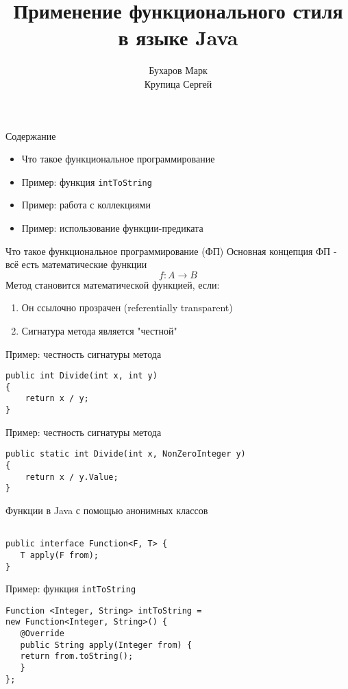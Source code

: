 \documentclass[aspectratio=169]{beamer}
\date{}
\title{Применение функционального стиля в языке Java}
\author{Бухаров Марк \\ Крупица Сергей}
\begin{document}
\begin{frame} 
	\titlepage
\end{frame}

\begin{frame}{Содержание}
	\begin{itemize}
		\item Что такое функциональное программирование
		\item Пример: функция \texttt{intToString}
		\item Пример: работа с коллекциями 
		\item Пример: использование функции-предиката
	\end{itemize}
\end{frame}

\begin{frame}{Что такое функциональное программирование (ФП)}
	Основная концепция ФП - всё есть математические функции
	\[ f: A \rightarrow B \]
	Метод становится математической функцией, если:
	\begin{enumerate}
		\item Он ссылочно прозрачен (referentially transparent)
		\item Сигнатура метода является "честной"
	\end{enumerate}
\end{frame}

\begin{frame}[fragile]{Пример: честность сигнатуры метода}
	\begin{verbatim}
public int Divide(int x, int y)
{
    return x / y;
}
	\end{verbatim}
\end{frame}

\begin{frame}[fragile]{Пример: честность сигнатуры метода}
	\begin{verbatim}
public static int Divide(int x, NonZeroInteger y)
{
    return x / y.Value;
}
	\end{verbatim}
\end{frame}


\begin{frame}[fragile]{Функции в Java с помощью анонимных классов}
	\begin{verbatim}

public interface Function<F, T> {
   T apply(F from);
}
	\end{verbatim}
\end{frame}

\begin{frame}[fragile]{Пример: функция \texttt{intToString}}
	\begin{verbatim}
Function <Integer, String> intToString = 
new Function<Integer, String>() {
   @Override
   public String apply(Integer from) {
   return from.toString();
   }
};

	\end{verbatim}
\end{frame}
\end{document}
